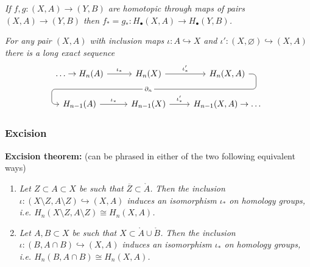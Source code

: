 \documentclass[10pt]{article}
\newcommand{\interior}[1]{\mathring{#1}}
\newcommand{\closure}[1]{\overline{#1}}
\begin{document}
                \emph{If $f,g\colon(X,A)\to(Y,B)$ are homotopic through maps of pairs $(X,A)\to(Y,B)$ then \mbox{$f_*=g_*\colon H_\bullet(X,A)\to H_\bullet(Y,B)$}.}

                \medskip

                \emph{For \emph{any} pair $(X,A)$ with inclusion maps $\iota\colon A\hookrightarrow X$ and \mbox{$\iota'\colon(X,\varnothing)\hookrightarrow(X,A)$} there is a long exact sequence}
                \begin{equation*}
                    \begin{tikzcd}
                        \ldots\to{H}_n(A) \rar{\iota_*}
                        & {H}_n(X) \rar{\iota'_*} \ar[draw=none]{d}[name=X, anchor=center]{}
                        & {H}_n(X,A) \ar[rounded corners,
                                to path={ -- ([xshift=2ex]\tikztostart.east)
                                          |- (X.center) \tikztonodes
                                          -| ([xshift=-2ex]\tikztotarget.west)
                                          -- (\tikztotarget)}]{dll}[description, at end]{\partial_n} \\
                        {H}_{n-1}(A) \rar{\iota_*}
                        & {H}_{n-1}(X) \rar{\iota'_*}
                        & {H}_{n-1}(X,A)\to\ldots
                    \end{tikzcd}
                \end{equation*}

            \subsubsection{Excision}

                \textbf{Excision theorem:} (can be phrased in either of the two following equivalent ways)
                \begin{enumerate}
                    \item \emph{Let $Z\subset A\subset X$ be such that $\closure{Z}\subset\interior{A}$.}
                        \emph{Then the inclusion $\iota\colon(X\setminus Z,A\setminus Z)\hookrightarrow(X,A)$ induces an isomorphism $\iota_*$ on homology groups, i.e. $H_n(X\setminus Z,A\setminus Z)\cong H_n(X,A)$.}
                    \item \emph{Let $A,B\subset X$ be such that $X\subset\interior{A}\cup\interior{B}$.}
                        \emph{Then the inclusion $\iota\colon(B,A\cap B)\hookrightarrow(X,A)$ induces an isomorphism $\iota_*$ on homology groups, i.e. $H_n(B,A\cap B)\cong H_n(X,A)$.}
                \end{enumerate}
\end{document}
